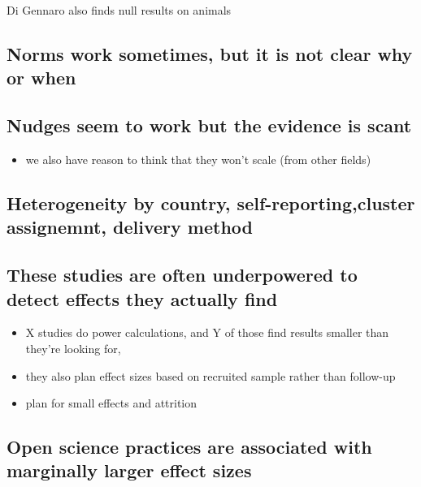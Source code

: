 \documentclass[sn-nature,pdflatex]{sn-jnl}
\providecommand{\tightlist}{%
  \setlength{\itemsep}{0pt}\setlength{\parskip}{0pt}}
\begin{document}
Di Gennaro also finds null results on animals

\subsection{Norms work sometimes, but it is not clear why or
when}\label{norms-work-sometimes-but-it-is-not-clear-why-or-when}

\subsection{Nudges seem to work but the evidence is
scant}\label{nudges-seem-to-work-but-the-evidence-is-scant}

\begin{itemize}
\tightlist
\item
  we also have reason to think that they won't scale (from other fields)
\end{itemize}

\subsection{Heterogeneity by country, self-reporting,cluster assignemnt,
delivery
method}\label{heterogeneity-by-country-self-reportingcluster-assignemnt-delivery-method}

\subsection{These studies are often underpowered to detect effects they
actually
find}\label{these-studies-are-often-underpowered-to-detect-effects-they-actually-find}

\begin{itemize}
\tightlist
\item
  X studies do power calculations, and Y of those find results smaller
  than they're looking for,
\item
  they also plan effect sizes based on recruited sample rather than
  follow-up
\item
  plan for small effects and attrition
\end{itemize}

\subsection{Open science practices are associated with marginally larger
effect
sizes}\label{open-science-practices-are-associated-with-marginally-larger-effect-sizes}
\end{document}

